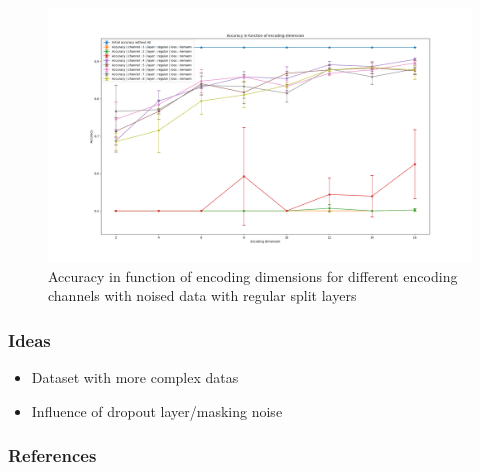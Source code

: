 \documentclass{beamer}
\begin{document}
\begin{frame}
    \begin{figure}
        \centering
        \includegraphics[width=\textwidth]{figures/acc_noise_regular.png}
        \caption{Accuracy in function of encoding dimensions for different encoding channels with noised data with regular split layers}
    \end{figure}
\end{frame}

\begin{frame}
    \frametitle{Ideas}
    \begin{itemize}
        \item Dataset with more complex datas 
        \item Influence of dropout layer/masking noise
    \end{itemize}
\end{frame}

\begin{frame}[allowframebreaks]
    \frametitle{References}
    
    
\end{frame}


\end{document}
